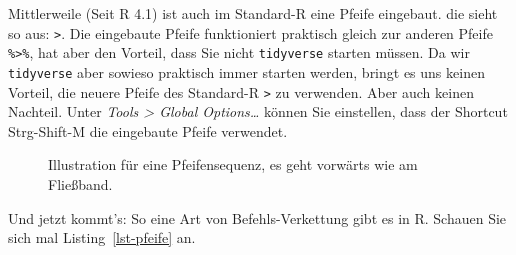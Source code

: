 \documentclass[
  letterpaper,
]{scrbook}
\theoremstyle{definition}
\theoremstyle{definition}
\theoremstyle{definition}
\theoremstyle{remark}
\begin{document}

Mittlerweile (Seit R 4.1) ist auch im Standard-R eine Pfeife eingebaut.
die sieht so aus: \texttt{\textbar{}\textgreater{}}. Die eingebaute
Pfeife funktioniert praktisch gleich zur anderen Pfeife
\texttt{\%\textgreater{}\%}, hat aber den Vorteil, dass Sie nicht
\texttt{tidyverse} starten müssen. Da wir \texttt{tidyverse} aber
sowieso praktisch immer starten werden, bringt es uns keinen Vorteil,
die neuere Pfeife des Standard-R \texttt{\textbar{}\textgreater{}} zu
verwenden. Aber auch keinen Nachteil. Unter \emph{Tools \textgreater{}
Global Options\ldots{}} können Sie einstellen, dass der Shortcut
Strg-Shift-M die eingebaute Pfeife verwendet.

\begin{figure}


\caption{\label{fig-pfeife}Illustration für eine Pfeifensequenz, es geht
vorwärts wie am Fließband.}

\end{figure}%

Und jetzt kommt's: So eine Art von Befehls-Verkettung gibt es in R.
Schauen Sie sich mal Listing~\ref{lst-pfeife} an.
\end{document}

